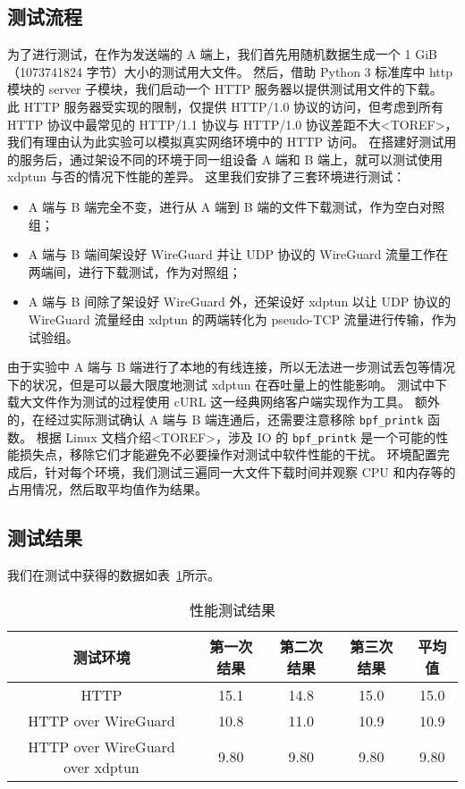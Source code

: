 \subsection{测试流程}

为了进行测试，在作为发送端的 A 端上，我们首先用随机数据生成一个 1 GiB（1073741824 字节）大小的测试用大文件。
然后，借助 Python 3 标准库中 http 模块的 server 子模块，我们启动一个 HTTP 服务器以提供测试用文件的下载。
此 HTTP 服务器受实现的限制，仅提供 HTTP/1.0 协议的访问，但考虑到所有 HTTP 协议中最常见的 HTTP/1.1 协议与 HTTP/1.0 协议差距不大<TOREF>，我们有理由认为此实验可以模拟真实网络环境中的 HTTP 访问。
在搭建好测试用的服务后，通过架设不同的环境于同一组设备 A 端和 B 端上，就可以测试使用 xdptun 与否的情况下性能的差异。
这里我们安排了三套环境进行测试：

\begin{itemize}
  \item A 端与 B 端完全不变，进行从 A 端到 B 端的文件下载测试，作为空白对照组；
  \item A 端与 B 端间架设好 WireGuard 并让 UDP 协议的 WireGuard 流量工作在两端间，进行下载测试，作为对照组；
  \item A 端与 B 间除了架设好 WireGuard 外，还架设好 xdptun 以让 UDP 协议的 WireGuard 流量经由 xdptun 的两端转化为 pseudo-TCP 流量进行传输，作为试验组。
\end{itemize}

由于实验中 A 端与 B 端进行了本地的有线连接，所以无法进一步测试丢包等情况下的状况，但是可以最大限度地测试 xdptun 在吞吐量上的性能影响。
测试中下载大文件作为测试的过程使用 cURL 这一经典网络客户端实现作为工具。
额外的，在经过实际测试确认 A 端与 B 端连通后，还需要注意移除 \texttt{bpf\_printk} 函数。
根据 Linux 文档介绍<TOREF>，涉及 IO 的 \texttt{bpf\_printk} 是一个可能的性能损失点，移除它们才能避免不必要操作对测试中软件性能的干扰。
环境配置完成后，针对每个环境，我们测试三遍同一大文件下载时间并观察 CPU 和内存等的占用情况，然后取平均值作为结果。

\subsection{测试结果}

我们在测试中获得的数据如表~\ref{tab:perf-test}所示。

\begin{table}[h]
  \centering
  \caption{性能测试结果}
  \label{tab:perf-test}
  \begin{tabular}{c c c c c}
    \toprule
    测试环境 & 第一次结果 & 第二次结果 & 第三次结果 & 平均值 \\
    \midrule
    HTTP & 15.1 & 14.8 & 15.0 & 15.0 \\
    HTTP over WireGuard & 10.8 & 11.0 & 10.9 & 10.9 \\
    HTTP over WireGuard over xdptun & 9.80 & 9.80 & 9.80 & 9.80 \\
    \bottomrule
  \end{tabular}
\end{table}


